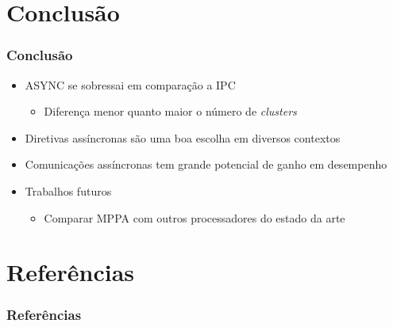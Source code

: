\documentclass[xcolor={table}]{beamer}
\begin{document}
\section{Conclusão}
\begin{frame}\frametitle{Conclusão}
    \begin{itemize}
        \item {ASYNC se sobressai em comparação a IPC}
        \begin{itemize}
            \item {Diferença menor quanto maior o número de \textit{clusters}}
        \end{itemize}
        \item {Diretivas assíncronas são uma boa escolha em diversos contextos}
        \item {Comunicações assíncronas tem grande potencial de ganho em desempenho}
        \item {Trabalhos futuros}
        \begin{itemize}
            \item {Comparar MPPA com outros processadores do estado da arte}
        \end{itemize}
    \end{itemize}
\end{frame}

\begingroup
    \makeatletter
    \setlength{\hoffset}{-.5\beamer@sidebarwidth}
    \makeatother
    \begin{frame}
        \titlepage
    \end{frame}
\endgroup


\section{Referências}
\begin{frame}\frametitle{Referências}
    {\tiny
        
        }
\end{frame}
\end{document}
